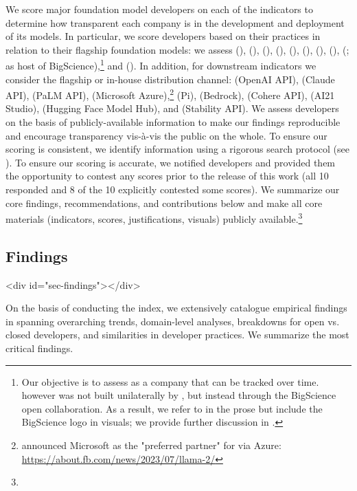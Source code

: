 \documentclass[screen, authorversion, acmsmall]{acmart}
\begin{document}
We score \numcompanies major foundation model developers on each of the \numindicators indicators to determine how transparent each company is in the development and deployment of its models. 
In particular, we score developers based on their practices in relation to their flagship foundation models:
we assess \openai (\gptfour), \anthropic (\claude), \google (\palm), \meta (\llama), \inflection (\inflectionone), \amazon (\titan), \cohere (\command), \aitwentyone (\jurassic), \huggingface (\bloomz; as host of BigScience),\footnote{Our objective is to assess \huggingface as a company that can be tracked over time.
\bloomz however was not built unilaterally by \huggingface, but instead through the BigScience open collaboration. 
As a result, we refer to \huggingface in the prose but include the BigScience logo in visuals; we provide further discussion in .} and \stability (\stablediffusion). 
In addition, for downstream indicators we consider the flagship or in-house distribution channel: \openai (OpenAI API), \anthropic (Claude API), \google (PaLM API), \meta (Microsoft Azure),\footnote{\meta announced Microsoft as the "preferred partner" for \llama via Azure: \url{https://about.fb.com/news/2023/07/llama-2/}} \inflection (Pi), \amazon (Bedrock), \cohere (Cohere API), \aitwentyone (AI21 Studio), \huggingface (Hugging Face Model Hub), and \stability (Stability API).
We assess developers on the basis of publicly-available information to make our findings reproducible and encourage transparency vis-à-vis the public on the whole.
To ensure our scoring is consistent, we identify information using a rigorous search protocol (see ).
To ensure our scoring is accurate, we notified developers and provided them the opportunity to contest any scores prior to the release of this work (all 10 responded and 8 of the 10 explicitly contested some scores).
We summarize our core findings, recommendations, and contributions below and make all core materials (\eg indicators, scores, justifications, visuals) publicly available.\footnote{\materialsUrl}
\hypertarget{findings}{\subsection{Findings}}
<div id="sec-findings"></div>


On the basis of conducting the index, we extensively catalogue \numtotalfindings empirical findings in  spanning overarching trends, domain-level analyses, breakdowns for open vs. closed developers, and similarities in developer practices.
We summarize the \numbigfindings most critical findings.
\end{document}
